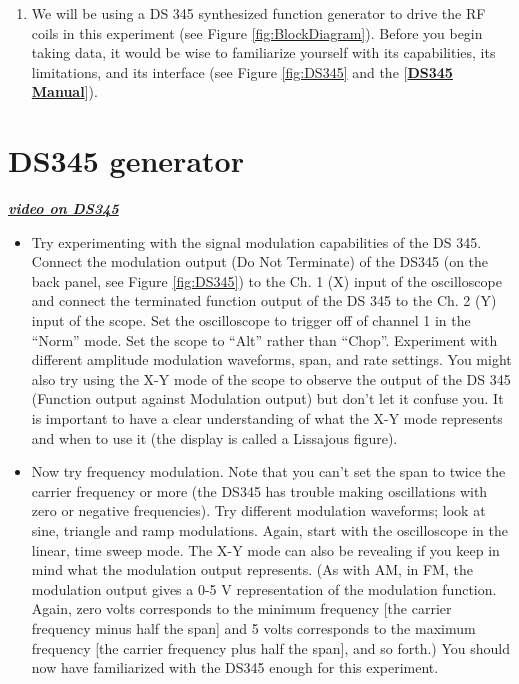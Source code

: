 \documentclass{../lab}
\newcommand{\DSManual}{http://physics111.lib.berkeley.edu/Physics111/Equipment_Manuals/SRS/DS345m.pdf}
\begin{document}
\begin{enumerate}
\newpage

    \item We will be using a DS 345 synthesized function generator to drive the RF coils in this experiment (see Figure \ref{fig:BlockDiagram}). Before you begin taking data, it would be wise to familiarize yourself with its capabilities, its limitations, and its interface (see Figure \ref{fig:DS345} and the [\href{\DSManual}{\textbf{DS345 Manual}}]).
\end{enumerate}

\section{DS345 generator} \href{http://experimentationlab.berkeley.edu/ds345}{\emph{\textbf{video on DS345}}}
\begin{itemize}
    \item Try experimenting with the signal modulation capabilities of the DS 345. Connect the modulation output (Do Not Terminate) of the DS345 (on the back panel, see Figure \ref{fig:DS345}) to the Ch. 1 (X) input of the oscilloscope and connect the terminated function output of the DS 345 to the Ch. 2 (Y) input of the scope. Set the oscilloscope to trigger off of channel 1 in the ``Norm'' mode. Set the scope to ``Alt'' rather than ``Chop''. Experiment with different amplitude modulation waveforms, span, and rate settings. You might also try using the X-Y mode of the scope to observe the output of the DS 345 (Function output against Modulation output) but don't let it confuse you. It is important to have a clear understanding of what the X-Y mode represents and when to use it (the display is called a Lissajous figure).

    \item Now try frequency modulation. Note that you can't set the span to twice the carrier frequency or more (the DS345 has trouble making oscillations with zero or negative frequencies). Try different modulation waveforms; look at sine, triangle and ramp modulations. Again, start with the oscilloscope in the linear, time sweep mode. The X-Y mode can also be revealing if you keep in mind what the modulation output represents. (As with AM, in FM, the modulation output gives a 0-5 V representation of the modulation function. Again, zero volts corresponds to the minimum frequency [the carrier frequency minus half the span] and 5 volts corresponds to the maximum frequency [the carrier frequency plus half the span], and so forth.) You should now have familiarized with the DS345 enough for this experiment.
\end{itemize}
\end{document}
